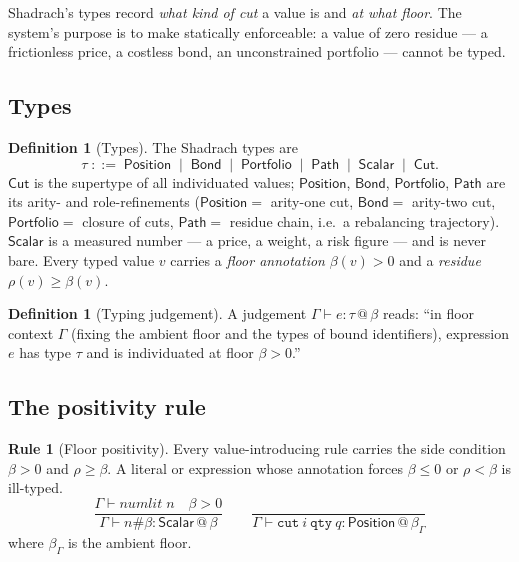 \documentclass[11pt,a4paper]{article}
\theoremstyle{thmstyle}
\theoremstyle{definition}
\newtheorem{definition}[theorem]{Definition}
\newtheorem{rulename}[theorem]{Rule}
\theoremstyle{remark}
\newcommand{\flo}{\beta}
\newcommand{\res}{\rho}
\newcommand{\bnf}{\;::=\;}
\newcommand{\alt}{\;\mid\;}
\newcommand{\sh}[1]{\texttt{#1}}
\begin{document}
Shadrach's types record \emph{what kind of cut} a value is and \emph{at
what floor}. The system's purpose is to make
 statically enforceable: a value of zero
residue --- a frictionless price, a costless bond, an unconstrained
portfolio --- cannot be typed.

\subsection{Types}

\begin{definition}[Types]
\label{def:types}
The Shadrach types are
\[
\tau \bnf \mathsf{Position} \alt \mathsf{Bond} \alt \mathsf{Portfolio}
   \alt \mathsf{Path} \alt \mathsf{Scalar} \alt \mathsf{Cut}.
\]
$\mathsf{Cut}$ is the supertype of all individuated values;
$\mathsf{Position}$, $\mathsf{Bond}$, $\mathsf{Portfolio}$,
$\mathsf{Path}$ are its arity- and role-refinements
($\mathsf{Position}=$ arity-one cut, $\mathsf{Bond}=$ arity-two cut,
$\mathsf{Portfolio}=$ closure of cuts, $\mathsf{Path}=$ residue chain,
i.e.\ a rebalancing trajectory). $\mathsf{Scalar}$ is a measured
number --- a price, a weight, a risk figure --- and is never bare. Every
typed value $v$ carries a \emph{floor annotation} $\flo(v)>0$ and a
\emph{residue} $\res(v)\ge\flo(v)$.
\end{definition}

\begin{definition}[Typing judgement]
\label{def:judgement}
A judgement $\Gamma\vdash e:\tau\,@\,\flo$ reads: ``in floor context
$\Gamma$ (fixing the ambient floor and the types of bound identifiers),
expression $e$ has type $\tau$ and is individuated at floor
$\flo>0$.''
\end{definition}

\subsection{The positivity rule}

\begin{rulename}[Floor positivity]
\label{rule:positive}
Every value-introducing rule carries the side condition $\flo>0$ and
$\res\ge\flo$. A literal or expression whose annotation forces
$\flo\le0$ or $\res<\flo$ is ill-typed.
\[
\frac{\Gamma\vdash\textit{numlit}\;n\quad\flo>0}
     {\Gamma\vdash n\#\flo:\mathsf{Scalar}\,@\,\flo}
\qquad
\frac{}{\Gamma\vdash\sh{cut}\ i\ \sh{qty}\ q:\mathsf{Position}\,@\,\flo_\Gamma}
\]
where $\flo_\Gamma$ is the ambient floor.
\end{rulename}
\end{document}
